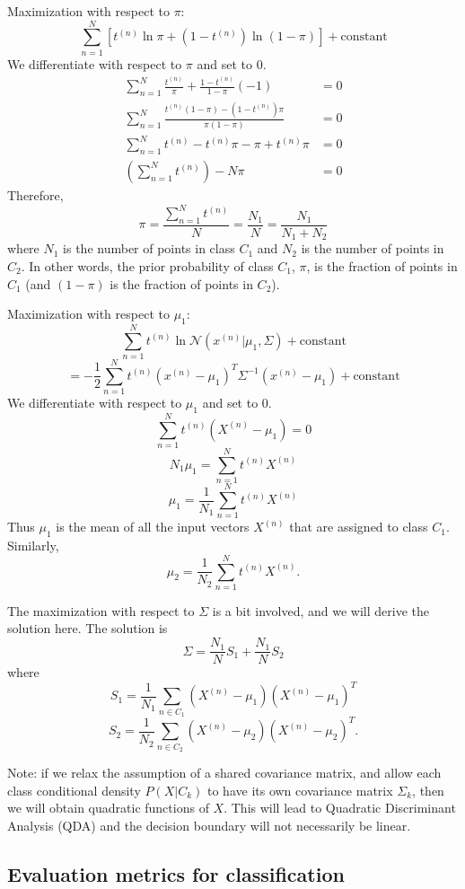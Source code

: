 \documentclass[a4paper,12pt]{article}
\begin{document}
Maximization with respect to $\pi$: 
$$\sum_{n=1}^N \left[t^{(n)} \ln \pi + (1 - t^{(n)}) \ln (1-\pi) \right] + \text{constant}$$
We differentiate with respect to $\pi$ and set to 0. 
\begin{align*}
\sum_{n=1}^N \frac{t^{(n)}}{\pi} + \frac{1-t^{(n)}}{1-\pi}(-1) &=0\\
\sum_{n=1}^N \frac{t^{(n)}(1-\pi) - (1-t^{(n)})\pi}{\pi(1-\pi)} &=0\\
\sum_{n=1}^N t^{(n)} - t^{(n)}\pi - \pi + t^{(n)}\pi &=0\\
\left(\sum_{n=1}^N t^{(n)}\right) - N\pi &=0
\end{align*}
Therefore, 
$$\pi = \frac{\sum_{n=1}^N t^{(n)}}{N} = \frac{N_1}{N} = \frac{N_1}{N_1+N_2}$$
where $N_1$ is the number of points in class $C_1$ and $N_2$ is the number of points in $C_2$. In other words, the prior probability of class $C_1$, $\pi$, is the fraction of points in $C_1$ (and $(1-\pi)$ is the fraction of points in $C_2$). 

Maximization with respect to $\mu_1$: 
$$\sum_{n=1}^N t^{(n)} \ln \mathcal{N}(x^{(n)} | \mu_1, \Sigma) + \text{constant}$$
$$= -\frac{1}{2} \sum_{n=1}^N t^{(n)}(x^{(n)}-\mu_1)^T \Sigma^{-1}(x^{(n)}-\mu_1) + \text{constant}$$
We differentiate with respect to $\mu_1$ and set to 0. 
$$\sum_{n=1}^N t^{(n)} (X^{(n)} - \mu_1) = 0$$
$$N_1 \mu_1 = \sum_{n=1}^N t^{(n)} X^{(n)}$$
$$\mu_1 = \frac{1}{N_1}\sum_{n=1}^N t^{(n)} X^{(n)}$$
Thus $\mu_1$ is the mean of all the input vectors $X^{(n)}$ that are assigned to class $C_1$. Similarly, 
$$\mu_2 = \frac{1}{N_2}\sum_{n=1}^N t^{(n)} X^{(n)}.$$

The maximization with respect to $\Sigma$ is a bit involved, and we will derive the solution here. The solution is 
$$\Sigma = \frac{N_1}{N}S_1 + \frac{N_1}{N}S_2$$
where 
$$S_1 = \frac{1}{N_1} \sum_{n\in C_1} (X^{(n)}-\mu_1) (X^{(n)}-\mu_1)^T$$
$$S_2 = \frac{1}{N_2} \sum_{n\in C_2} (X^{(n)}-\mu_2) (X^{(n)}-\mu_2)^T.$$

Note: if we relax the assumption of a shared covariance matrix, and allow each class conditional density $P(X|C_k)$ to have its own covariance matrix $\Sigma_k$, then we will obtain quadratic functions of $X$. This will lead to Quadratic Discriminant Analysis (QDA) and the decision boundary will not necessarily be linear. 

\subsection{Evaluation metrics for classification}
\end{document}
